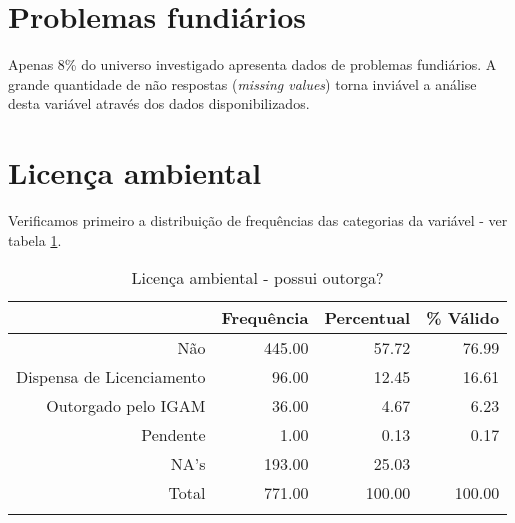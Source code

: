 \documentclass[a4paper, 12pt, openright, oneside, english, brazil, article]{abntex2}
\begin{document}
	
	\section{Problemas fundiários}
	Apenas 8\% do universo investigado apresenta dados de problemas fundiários. A grande quantidade de não respostas (\textit{missing values}) torna inviável a análise desta variável através dos dados disponibilizados.
	
	
	\section{Licença ambiental}
	Verificamos primeiro a distribuição de frequências das categorias da variável - ver tabela \ref{outorga}.
	
	\begin{scriptsize}
		\begin{longtable}{rrrr}
			\caption{Licença ambiental - possui outorga?} \\ 
			\hline
			& Frequência & Percentual & \% Válido \\ 
			\hline
			Não & 445.00 & 57.72 & 76.99 \\ 
			Dispensa de Licenciamento & 96.00 & 12.45 & 16.61 \\ 
			Outorgado pelo IGAM & 36.00 & 4.67 & 6.23 \\ 
			Pendente & 1.00 & 0.13 & 0.17 \\ 
			NA's & 193.00 & 25.03 &  \\ 
			\hline
			Total & 771.00 & 100.00 & 100.00 \\ 
			\hline
			\hline
			\label{outorga}
		\end{longtable}
	\end{scriptsize}
\end{document}

